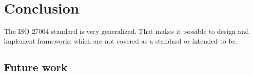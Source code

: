 \section{Conclusion}
\label{sec:conclusion}

The ISO 27004 standard is very generalized. That makes it possible to design and implement frameworks which are not covered as a standard or intended to be. 

\subsection{Future work}
